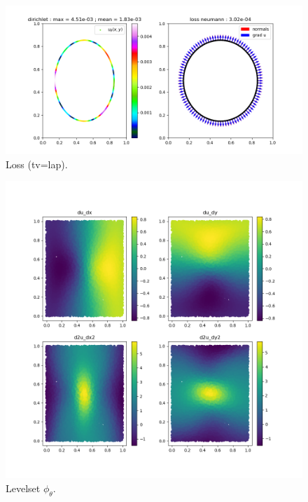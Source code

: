 \documentclass[french]{article}
\begin{document}
	\begin{minipage}{0.56\linewidth}
		\begin{figure}[H]
			\centering
			\includegraphics[width=\linewidth]{"levelset/circle/bc_circle.png"}
			\caption{Loss (tv=lap).}
		\end{figure}
	\end{minipage}
	\begin{minipage}{0.43\linewidth}
		\begin{figure}[H]
			\centering
			\includegraphics[width=\linewidth]{"levelset/circle/derivees_circle.png"}
			\caption{Levelset $\phi_\theta$.}
		\end{figure}
	\end{minipage}
	
\end{document}
